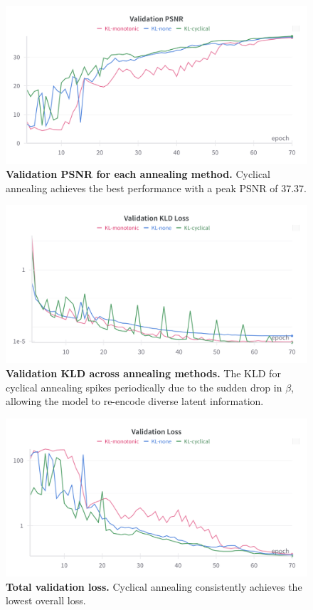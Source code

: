 \documentclass[twocolumn,a4paper]{article}
\begin{document}
\begin{figure}[H]
\centering
\includegraphics[width=0.95\linewidth]{figures/kl_val_psnr}
\caption{\textbf{Validation PSNR for each annealing method.} Cyclical annealing achieves the best performance with a peak PSNR of 37.37.}
\label{fig:klvalpsnr}
\end{figure}

\begin{figure}[H]
\centering
\includegraphics[width=0.95\linewidth]{figures/val_kl_KLD}
\caption{\textbf{Validation KLD across annealing methods.} The KLD for cyclical annealing spikes periodically due to the sudden drop in $\beta$, allowing the model to re-encode diverse latent information.}
\label{fig:valklkld}
\end{figure}

\begin{figure}[H]
\centering
\includegraphics[width=0.95\linewidth]{figures/val_kl_loss}
\caption{\textbf{Total validation loss.} Cyclical annealing consistently achieves the lowest overall loss.}
\label{fig:valklloss}
\end{figure}
\end{document}
